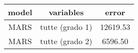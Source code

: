 \begin{table}[tb]
\centering
\begin{tabular}{| c | c | c }
  \hline
model & variables & error \\ 
  \hline
MARS & tutte (grado 1) & 12619.53 \\ 
  MARS & tutte (grado 2) & 6596.50 \\ 
   \hline
\end{tabular}
\caption{} 
\label{}
\end{table}
